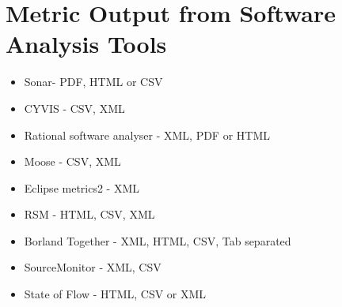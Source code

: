 \section{Metric Output from Software Analysis Tools}

\begin{itemize}
	\item Sonar- PDF, HTML or CSV
	\item CYVIS - CSV, XML
	\item Rational software analyser - XML, PDF or HTML
	\item Moose - CSV, XML
	\item Eclipse metrics2 - XML
	\item RSM - HTML, CSV, XML
	\item Borland Together - XML, HTML, CSV, Tab separated
	\item SourceMonitor - XML, CSV
	\item State of Flow - HTML, CSV or XML
\end{itemize}



